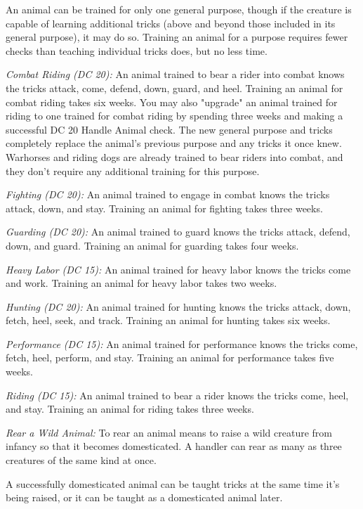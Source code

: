 An animal can be trained for only one general purpose, though if the creature is capable of learning additional tricks (above and beyond those included in its general purpose), it may do so. Training an animal for a purpose requires fewer checks than teaching individual tricks does, but no less time. 

\textit{Combat Riding (DC 20):} An animal trained to bear a rider into combat knows the tricks attack, come, defend, down, guard, and heel. Training an animal for combat riding takes six weeks. You may also "upgrade" an animal trained for riding to one trained for combat riding by spending three weeks and making a successful DC 20 Handle Animal check. The new general purpose and tricks completely replace the animal's previous purpose and any tricks it once knew. Warhorses and riding dogs are already trained to bear riders into combat, and they don't require any additional training for this purpose.

\textit{Fighting (DC 20):} An animal trained to engage in combat knows the tricks attack, down, and stay. Training an animal for fighting takes three weeks.

\textit{Guarding (DC 20):} An animal trained to guard knows the tricks attack, defend, down, and guard. Training an animal for guarding takes four weeks.

\textit{Heavy Labor (DC 15):} An animal trained for heavy labor knows the tricks come and work. Training an animal for heavy labor takes two weeks.

\textit{Hunting (DC 20):} An animal trained for hunting knows the tricks attack, down, fetch, heel, seek, and track. Training an animal for hunting takes six weeks.

\textit{Performance (DC 15):} An animal trained for performance knows the tricks come, fetch, heel, perform, and stay. Training an animal for performance takes five weeks.

\textit{Riding (DC 15):} An animal trained to bear a rider knows the tricks come, heel, and stay. Training an animal for riding takes three weeks.

\textit{Rear a Wild Animal:} To rear an animal means to raise a wild creature from infancy so that it becomes domesticated. A handler can rear as many as three creatures of the same kind at once.

A successfully domesticated animal can be taught tricks at the same time it's being raised, or it can be taught as a domesticated animal later.

